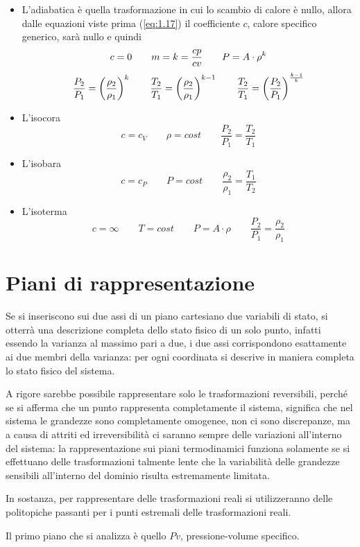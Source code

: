 \begin{adjustwidth}{2in}{}
\begin{itemize}
	\item L'adiabatica è quella trasformazione in cui lo scambio di calore è nullo, allora dalle equazioni viste prima (\ref{eq:1.17}) il coefficiente $c$, calore specifico generico, sarà nullo e quindi 
	\[c=0 \qquad m=k={cp\over cv} \qquad P=A\cdot\rho^k\]
	\[\dfrac{P_2}{P_1} = \left(\dfrac{\rho_2}{\rho_1}\right)^k \qquad \dfrac{T_2}{T_1} = \left(\dfrac{\rho_2}{\rho_1}\right)^{k-1} \qquad \dfrac{T_2}{T_1} = \left(\dfrac{P_2}{P_1}\right)^{k-1\over k}\]
	\item L'isocora 
	\[c=c_V \qquad \rho = cost \qquad \dfrac{P_2}{P_1} = \dfrac{T_2}{T_1}\]
	\item L'isobara 
	\[c=c_P \qquad P = cost \qquad \dfrac{\rho_2}{\rho_1} = \dfrac{T_1}{T_2}\]
	\item L'isoterma 
	\[c=\infty  \qquad T = cost \qquad P=A\cdot\rho \qquad \dfrac{P_2}{P_1} = \dfrac{\rho_2}{\rho_1}\]
	\end{itemize}	 
	
	\section{Piani di rappresentazione}
	Se si inseriscono sui due assi di un piano cartesiano due variabili di stato, si otterrà una descrizione completa dello stato fisico di un solo punto, infatti essendo la varianza al massimo pari a due, i due assi corrispondono esattamente ai due membri della varianza: per ogni coordinata si descrive in maniera completa lo stato fisico del sistema. 
	
	A rigore sarebbe possibile rappresentare solo le trasformazioni reversibili, perché se si afferma che un punto rappresenta completamente il sistema, significa che nel sistema le grandezze sono completamente omogenee, non ci sono discrepanze, ma a causa di attriti ed irreversibilità ci saranno sempre delle variazioni all'interno del sistema: la rappresentazione sui piani termodinamici funziona solamente se si effettuano delle trasformazioni talmente lente che la variabilità delle grandezze sensibili all'interno del dominio risulta estremamente limitata.
	
	In sostanza, per rappresentare delle trasformazioni reali si utilizzeranno delle politopiche passanti per i punti estremali delle trasformazioni reali. 
	
	Il primo piano che si analizza è quello $Pv$, pressione-volume specifico.
	

\end{adjustwidth}
